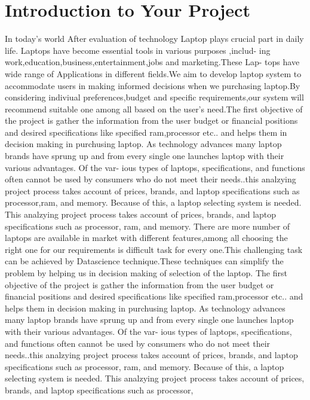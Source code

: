 \section{Introduction to Your Project}
In today’s world After evaluation of technology Laptop plays crucial part in daily life. Laptops have become
essential tools in various purposes ,includ- ing work,education,business,entertainment,jobs and marketing.These
Lap- tops have wide range of Applications in different fields.We aim to develop laptop system to accommodate
users in making informed decisions when we purchasing laptop.By considering indiviual preferences,budget
and specific requirements,our system will recommend suitable one among all based on the user’s need.The
first objective of the project is gather the information from the user budget or financial positions and desired
specifications like specified ram,processor etc.. and helps them in decision making in purchusing laptop.
As technology advances many laptop brands have sprung up and from every single one launches laptop with
their various advantages. Of the var- ious types of laptops, specifications, and functions often cannot be used
by consumers who do not meet their needs..this analzying project process takes account of prices, brands, and
laptop specifications such as processor,ram, and memory. Because of this, a laptop selecting system is needed.
This analzying project process takes account of prices, brands, and laptop specifications such as processor,
ram, and memory. There are more number of laptops are available in market with different features,among
all choosing the right one for our requirements is difficult task for every one.This challenging task can be
achieved by Datascience technique.These techniques can simplify the problem by helping us in decision making
of selection of the laptop.
The first objective of the project is gather the information from the user budget or financial positions and
desired specifications like specified ram,processor etc.. and helps them in decision making in purchusing laptop.
As technology advances many laptop brands have sprung up and from every single one launches laptop with
their various advantages. Of the var- ious types of laptops, specifications, and functions often cannot be used
by consumers who do not meet their needs..this analzying project process takes account of prices, brands, and
laptop specifications such as processor, ram, and memory. Because of this, a laptop selecting system is needed.
This analzying project process takes account of prices, brands, and laptop specifications such as processor,
